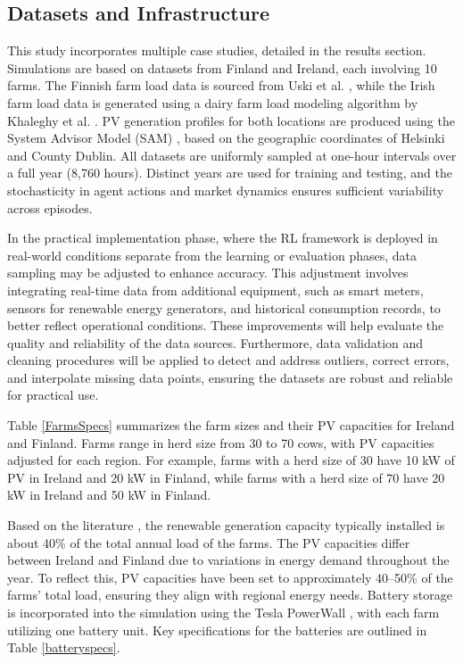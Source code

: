\documentclass[preprint,12pt]{elsarticle}
\begin{document}
\subsection{Datasets and Infrastructure}
\label{dataset&infra}

This study incorporates multiple case studies, detailed in the results section. Simulations are based on datasets from Finland and Ireland, each involving 10 farms. The Finnish farm load data is sourced from Uski et al. \cite{uski2018microgrid}, while the Irish farm load data is generated using a dairy farm load modeling algorithm by Khaleghy et al. \cite{khaleghy2023modelling}. PV generation profiles for both locations are produced using the System Advisor Model (SAM) \cite{samNrel}, based on the geographic coordinates of Helsinki and County Dublin. All datasets are uniformly sampled at one-hour intervals over a full year (8,760 hours). Distinct years are used for training and testing, and the stochasticity in agent actions and market dynamics ensures sufficient variability across episodes.

In the practical implementation phase, where the RL framework is deployed in real-world conditions separate from the learning or evaluation phases, data sampling may be adjusted to enhance accuracy. This adjustment involves integrating real-time data from additional equipment, such as smart meters, sensors for renewable energy generators, and historical consumption records, to better reflect operational conditions. These improvements will help evaluate the quality and reliability of the data sources. Furthermore, data validation and cleaning procedures will be applied to detect and address outliers, correct errors, and interpolate missing data points, ensuring the datasets are robust and reliable for practical use.

Table \ref{FarmsSpecs} summarizes the farm sizes and their PV capacities for Ireland and Finland. Farms range in herd size from 30 to 70 cows, with PV capacities adjusted for each region. For example, farms with a herd size of 30 have 10 kW of PV in Ireland and 20 kW in Finland, while farms with a herd size of 70 have 20 kW in Ireland and 50 kW in Finland.

Based on the literature \cite{SEAI2024}, the renewable generation capacity typically installed is about 40\% of the total annual load of the farms. The PV capacities differ between Ireland and Finland due to variations in energy demand throughout the year. To reflect this, PV capacities have been set to approximately 40–50\% of the farms' total load, ensuring they align with regional energy needs. Battery storage is incorporated into the simulation using the Tesla PowerWall \cite{Teslapower}, with each farm utilizing one battery unit. Key specifications for the batteries are outlined in Table \ref{batteryspecs}.
\end{document}
